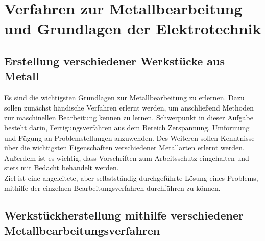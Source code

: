 \chapter{Verfahren zur Metallbearbeitung und Grundlagen der Elektrotechnik}
\label{cha:Metallbearbeitung und Elektrotechnik}

\section{Erstellung verschiedener Werkstücke aus Metall}

Es sind die wichtigsten Grundlagen zur Metallbearbeitung zu erlernen. Dazu sollen zunächst händische Verfahren erlernt werden, um anschließend Methoden 
zur maschinellen Bearbeitung kennen zu lernen. Schwerpunkt in dieser Aufgabe besteht darin, Fertigungsverfahren aus dem Bereich Zerspannung, Umformung 
und Fügung an Problemstellungen anzuwenden. Des Weiteren sollen Kenntnisse über die wichtigsten Eigenschaften verschiedener Metallarten erlernt werden. 
Außerdem ist es wichtig, dass Vorschriften zum Arbeitsschutz eingehalten und stets mit Bedacht behandelt werden. 
\\
Ziel ist eine angeleitete, aber selbstständig durchgeführte Lösung eines Problems, mithilfe der einzelnen Bearbeitungsverfahren durchführen zu können. 
\clearpage

\section{Werkstückherstellung mithilfe verschiedener Metallbearbeitungsverfahren}

